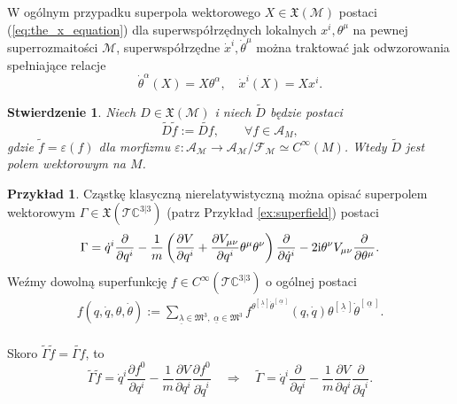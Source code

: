 \documentclass[11pt,a4paper]{report}
\newtheorem{proposition}[theorem]{Stwierdzenie}
\theoremstyle{definition}
\newtheorem{example}[theorem]{Przykład}
\begin{document}
W ogólnym przypadku superpola wektorowego $X \in \mathfrak{X}(\mathcal{M})$ postaci (\ref{eq:the_x_equation}) dla superwspółrzędnych lokalnych $x^i, \theta^\mu$ na pewnej superrozmaitości $\mathcal{M}$, superwspółrzędne $\dot x^i, \dot \theta^\mu$ można traktować jak odwzorowania spełniające relacje
\begin{equation*}
\dot \theta^\alpha(X)=X\theta^\alpha,\quad \dot x^i(X)=X x^i.
\end{equation*}

\begin{proposition}
Niech $D \in \mathfrak{X}(\mathcal{M})$ i niech $\widetilde{D}$ będzie postaci
\begin{equation*}
\widetilde{D}\widetilde{f}:=\widetilde{Df},\qquad \forall f\in \mathcal{A}_M,
\end{equation*}
gdzie $\widetilde f=\varepsilon(f)$ dla morfizmu $\varepsilon:\mathcal{A}_\mathcal{M} \rightarrow \mathcal{A}_\mathcal{M}/\mathcal{F}_\mathcal{M}\simeq C^\infty(M)$. Wtedy $\widetilde{D}$ jest polem wektorowym na $M$. \cite{monterde}
\end{proposition}

\begin{example}
 Cząstkę klasyczną nierelatywistyczną można opisać superpolem wektorowym $\Gamma \in \mathfrak{X}(\mathcal{T} \mathbb{C}^{3|3})$ (patrz Przykład \ref{ex:superfield}) postaci
 \begin{equation*}
  \Gamma = \dot q^i \frac{\partial}{\partial q^i} 
  - \frac{1}{m} \left( \frac{\partial V}{\partial q^i} + \frac{\partial V_{\mu \nu}}{\partial q^i} \theta^\mu \theta^\nu \right) \frac{\partial}{\partial \dot q^i} 
  - 2{\rm i} \theta^\nu V_{\mu \nu} \frac{\partial}{\partial \theta^\mu}.
 \end{equation*}
 Weźmy dowolną superfunkcję $f \in C^\infty(\mathcal{\mathcal{T}} \mathbb{C}^{3|3})$ o ogólnej postaci \\[-7pt]
 \begin{equation*}
 \begin{gathered}
  f(q,\dot q, \theta, \dot \theta) := \!\!\!\!\!\!\!\!
  \sum_{\underline{\lambda} \in \mathfrak{M}^3,\; \underline{\alpha} \in \mathfrak{M}^3} \!\!\!\!\!\!\!\! f^{\theta^{\left[\, \underline{\lambda}\, \right]} \dot \theta^{\left[\, \underline{\alpha}\, \right]}} (q, \dot q) \theta^{\left[\, \underline{\lambda}\, \right]} \dot \theta^{\left[\, \underline{\alpha}\, \right]}.
 \end{gathered}
 \end{equation*}\\[-13pt]
 Skoro $\widetilde \Gamma \widetilde f = \widetilde{\Gamma f}$, to\\[-7pt]
 \begin{equation*}
 \widetilde \Gamma \widetilde f = \dot q^i\frac{\partial f^0}{\partial q^i}
 -\frac1m \frac{\partial V}{\partial q^i}\frac{\partial f^0}{\partial \dot q^i} \quad 
 \Longrightarrow \quad \widetilde \Gamma = \dot q^i\frac{\partial}{\partial q^i} - \frac1m \frac{\partial V}{\partial q^i}\frac{\partial}{\partial \dot q^i}.
 \end{equation*}
\end{example}
\end{document}

